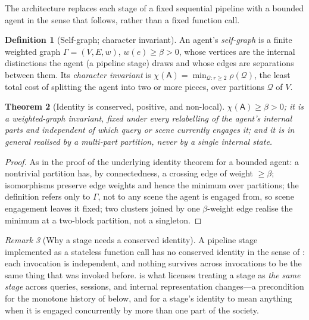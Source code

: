 \documentclass[11pt,twocolumn,a4paper]{article}
\theoremstyle{frathm}
\newtheorem{theorem}{Theorem}[section]
\theoremstyle{definition}
\newtheorem{definition}[theorem]{Definition}
\theoremstyle{remark}
\newtheorem{remark}[theorem]{Remark}
\newcommand{\V}{V}
\newcommand{\E}{E}
\newcommand{\wt}{w}
\newcommand{\flo}{\beta}
\newcommand{\Char}{\chi}
\newcommand{\Self}{\Gamma}
\begin{document}
The architecture replaces each stage of a fixed sequential pipeline with
a bounded agent in the sense that follows, rather than a fixed function
call.

\begin{definition}[Self-graph; character invariant]
\label{def:selfgraph}
An agent's \emph{self-graph} is a finite weighted graph
$\Self=(\V,\E,\wt)$, $\wt(e)\ge\flo>0$, whose vertices are the internal
distinctions the agent (a pipeline stage) draws and whose edges are
separations between them. Its \emph{character invariant} is
$\Char(\mathsf{A})=\min_{\mathcal{Q}:r\ge2}\rho(\mathcal{Q})$, the least
total cost of splitting the agent into two or more pieces, over
partitions $\mathcal{Q}$ of $\V$.
\end{definition}

\begin{theorem}[Identity is conserved, positive, and non-local]
\label{thm:agent-identity}
$\Char(\mathsf{A})\ge\flo>0$; it is a weighted-graph invariant, fixed
under every relabelling of the agent's internal parts and independent of
which query or scene currently engages it; and it is in general realised
by a multi-part partition, never by a single internal state.
\end{theorem}

\begin{proof}
As in the proof of the underlying identity theorem for a bounded agent: a
nontrivial partition has, by connectedness, a
crossing edge of weight $\ge\flo$; isomorphisms preserve edge weights and
hence the minimum over partitions; the definition refers only to
$\Self$, not to any scene the agent is engaged from, so scene engagement
leaves it fixed; two clusters joined by one $\flo$-weight edge realise the
minimum at a two-block partition, not a singleton.
\end{proof}

\begin{remark}[Why a stage needs a conserved identity]
\label{rem:why-identity}
A pipeline stage implemented as a stateless function call has no
conserved identity in the sense of : each invocation
is independent, and nothing survives across invocations to be the same
thing that was invoked before.  is what licenses
treating a stage as \emph{the same stage} across queries, sessions, and
internal representation changes---a precondition for the monotone history
of  below, and for a stage's identity to mean anything
when it is engaged concurrently by more than one part of the society.
\end{remark}
\end{document}
